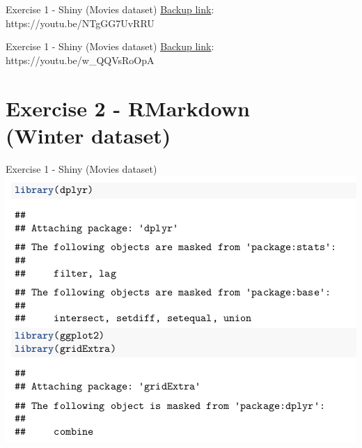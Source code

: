 \documentclass{beamer}
\begin{document}
\begin{frame}{Exercise 1 - Shiny (Movies dataset)}
    \href{https://youtu.be/NTgGG7UvRRU}{Backup link}: \footnotesize https://youtu.be/NTgGG7UvRRU
\end{frame}

\begin{frame}{Exercise 1 - Shiny (Movies dataset)}
    \href{https://youtu.be/w\_QQVsRoOpA}{Backup link}: \footnotesize https://youtu.be/w\_QQVsRoOpA
\end{frame}


\section{Exercise 2 - RMarkdown\\(Winter dataset)}
\begin{frame}{Exercise 1 - Shiny (Movies dataset)}
    \includegraphics[width=\textwidth, height=\textheight]{img/ex2_part1_q1.png}
\end{frame}
\end{document}

